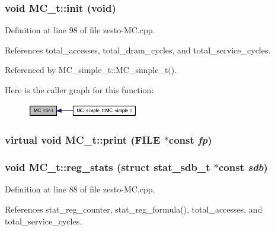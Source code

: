 \subsubsection[{init}]{\setlength{\rightskip}{0pt plus 5cm}void MC\_\-t::init (void)\hspace{0.3cm}{\tt  [protected]}}\label{classMC__t_a6c12cb45e7853f33232d8f81f8585a6}




Definition at line 98 of file zesto-MC.cpp.

References total\_\-accesses, total\_\-dram\_\-cycles, and total\_\-service\_\-cycles.

Referenced by MC\_\-simple\_\-t::MC\_\-simple\_\-t().

Here is the caller graph for this function:\nopagebreak
\begin{figure}[H]
\begin{center}
\leavevmode
\includegraphics[width=137pt]{classMC__t_a6c12cb45e7853f33232d8f81f8585a6_icgraph}
\end{center}
\end{figure}
\subsubsection[{print}]{\setlength{\rightskip}{0pt plus 5cm}virtual void MC\_\-t::print (FILE $\ast$const  {\em fp})\hspace{0.3cm}{\tt  [pure virtual]}}\label{classMC__t_a580bcbaf6e51754d914cc461cbb14c9}


\subsubsection[{reg\_\-stats}]{\setlength{\rightskip}{0pt plus 5cm}void MC\_\-t::reg\_\-stats (struct {\bf stat\_\-sdb\_\-t} $\ast$const {\em sdb})\hspace{0.3cm}{\tt  [virtual]}}\label{classMC__t_0c6dad2c581871f11c213c77430556f0}




Definition at line 88 of file zesto-MC.cpp.

References stat\_\-reg\_\-counter, stat\_\-reg\_\-formula(), total\_\-accesses, and total\_\-service\_\-cycles.

